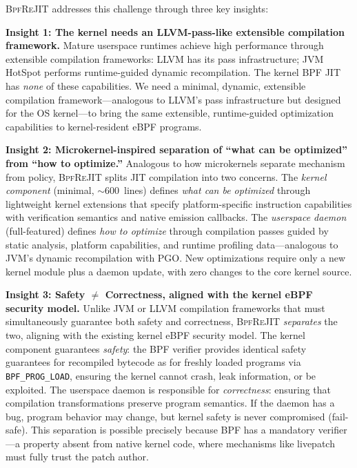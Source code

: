 \documentclass[sigconf,anonymous]{acmart}
\begin{document}
\textsc{BpfReJIT} addresses this challenge through three key insights:

\textbf{Insight 1: The kernel needs an LLVM-pass-like extensible
compilation framework.} Mature userspace runtimes achieve high
performance through extensible compilation frameworks: LLVM has its
pass infrastructure; JVM HotSpot performs runtime-guided dynamic
recompilation. The kernel BPF JIT has \emph{none} of these
capabilities. We need a minimal, dynamic, extensible compilation
framework---analogous to LLVM's pass infrastructure but designed for
the OS kernel---to bring the same extensible, runtime-guided
optimization capabilities to kernel-resident eBPF programs.

\textbf{Insight 2: Microkernel-inspired separation of ``what can be
optimized'' from ``how to optimize.''} Analogous to how microkernels
separate mechanism from policy, \textsc{BpfReJIT} splits JIT
compilation into two concerns. The \emph{kernel component} (minimal,
${\sim}$600~lines) defines \emph{what can be optimized} through
lightweight kernel extensions that specify platform-specific
instruction capabilities with verification semantics and native
emission callbacks. The \emph{userspace daemon} (full-featured)
defines \emph{how to optimize} through compilation passes guided by
static analysis, platform capabilities, and runtime profiling
data---analogous to JVM's dynamic recompilation with PGO. New
optimizations require only a new kernel module plus a daemon update,
with zero changes to the core kernel source.

\textbf{Insight 3: Safety $\neq$ Correctness, aligned with the kernel
eBPF security model.} Unlike JVM or LLVM compilation frameworks that
must simultaneously guarantee both safety and correctness,
\textsc{BpfReJIT} \emph{separates} the two, aligning with the
existing kernel eBPF security model. The kernel component guarantees
\emph{safety}: the BPF verifier provides identical safety guarantees
for recompiled bytecode as for freshly loaded programs via
\texttt{BPF\_PROG\_LOAD}, ensuring the kernel cannot crash, leak
information, or be exploited. The userspace daemon is responsible for
\emph{correctness}: ensuring that compilation transformations preserve
program semantics. If the daemon has a bug, program behavior may
change, but kernel safety is never compromised (fail-safe). This
separation is possible precisely because BPF has a mandatory
verifier---a property absent from native kernel code, where mechanisms
like livepatch must fully trust the patch author.
\end{document}
